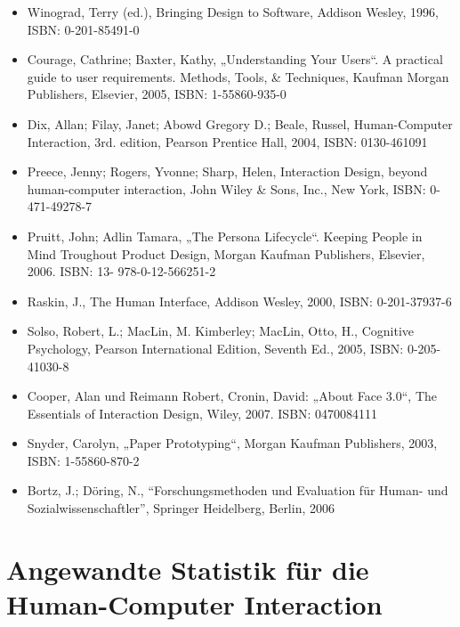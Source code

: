 \begin{itemize}
\tightlist
\item
  Winograd, Terry (ed.), Bringing Design to Software, Addison Wesley,
  1996, ISBN: 0-201-85491-0
\item
  Courage, Cathrine; Baxter, Kathy, „Understanding Your Users``. A
  practical guide to user requirements. Methods, Tools, \& Techniques,
  Kaufman Morgan Publishers, Elsevier, 2005, ISBN: 1-55860-935-0
\item
  Dix, Allan; Filay, Janet; Abowd Gregory D.; Beale, Russel,
  Human-Computer Interaction, 3rd. edition, Pearson Prentice Hall, 2004,
  ISBN: 0130-461091
\item
  Preece, Jenny; Rogers, Yvonne; Sharp, Helen, Interaction Design,
  beyond human-computer interaction, John Wiley \& Sons, Inc., New York,
  ISBN: 0-471-49278-7
\item
  Pruitt, John; Adlin Tamara, „The Persona Lifecycle``. Keeping People
  in Mind Troughout Product Design, Morgan Kaufman Publishers, Elsevier,
  2006. ISBN: 13- 978-0-12-566251-2
\item
  Raskin, J., The Human Interface, Addison Wesley, 2000, ISBN:
  0-201-37937-6
\item
  Solso, Robert, L.; MacLin, M. Kimberley; MacLin, Otto, H., Cognitive
  Psychology, Pearson International Edition, Seventh Ed., 2005, ISBN:
  0-205-41030-8
\item
  Cooper, Alan und Reimann Robert, Cronin, David: „About Face 3.0``, The
  Essentials of Interaction Design, Wiley, 2007. ISBN: 0470084111
\item
  Snyder, Carolyn, „Paper Prototyping``, Morgan Kaufman Publishers,
  2003, ISBN: 1-55860-870-2
\item
  Bortz, J.; Döring, N., ``Forschungsmethoden und Evaluation für Human-
  und Sozialwissenschaftler'', Springer Heidelberg, Berlin, 2006
\end{itemize}

\chapter{Angewandte Statistik für die Human-Computer
Interaction}\label{angewandte-statistik-fuxfcr-die-human-computer-interaction}

